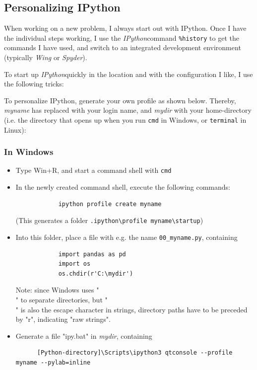 \subsection{Personalizing IPython}

When working on a new problem, I always start out with IPython. Once
I have the individual steps working, I use the \emph{IPython}command \lstinline{%history} to get the commands I have used, and switch to an integrated development environment (typically \emph{Wing} or \emph{Spyder}).

To start up \emph{IPython}quickly in the location and with the configuration I like, I use the following tricks:

To personalize IPython, generate your own profile as shown below. Thereby, \emph{myname} has replaced with your login name, and \emph{mydir} with your home-directory (i.e. the directory that opens up when you run \lstinline{cmd} in Windows, or \lstinline{terminal} in Linux):

\subsubsection{In Windows}

\begin{itemize}
  \item Type Win+R, and start a command shell with \lstinline{cmd}
  \item In the newly created command shell, execute the following commands:
        \begin{lstlisting}
            ipython profile create myname
        \end{lstlisting}
        (This generates a folder \lstinline{.ipython\profile myname\startup})
  \item Into this folder, place a file with e.g. the name \lstinline{00_myname.py}, containing
        \begin{lstlisting}
            import pandas as pd
            import os
            os.chdir(r'C:\mydir')
        \end{lstlisting}
        Note: since Windows uses "\\" to separate directories, but "\\" is also the escape character in strings, directory paths have to be preceded by "r", indicating "raw strings".
  \item Generate a file "ipy.bat" in \emph{mydir}, containing
      \begin{lstlisting}
      [Python-directory]\Scripts\ipython3 qtconsole --profile myname --pylab=inline
      \end{lstlisting}
\end{itemize}

